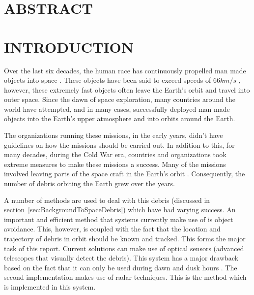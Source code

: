 \documentclass[11pt]{witseiepaper}
\begin{document}
\section*{ABSTRACT}


\clearpage


\clearpage

\tableofcontents

\listoffigures

\listoftables

\onecolumn
\clearpage
{}


\section{INTRODUCTION} \label{sec:INTRODUCTION}

Over the last six decades, the human race has continuously propelled man made objects into space \cite{sputnik}. These objects have been said to exceed speeds of $66 km/s$ \cite{fastestObject}, however, these extremely fast objects often leave the Earth's orbit and travel into outer space. Since the dawn of space exploration, many countries around the world have attempted, and in many cases, successfully deployed man made objects into the Earth's upper atmosphere and into orbits around the Earth.

The organizations running these missions, in the early years, didn't have guidelines on how the missions should be carried out. In addition to this, for many decades, during the Cold War era, countries and organizations took extreme measures to make these missions a success. Many of the missions involved leaving parts of the space craft in the Earth's orbit \cite{spaceDebrisGuide}. Consequently, the number of debris orbiting the Earth grew over the years.

A number of methods are used to deal with this debris (discussed in section~\ref{sec:BackgroundToSpaceDebris}) which have had varying success.
An important and efficient method that systems currently make use of is object avoidance. This, however, is coupled with the fact that the location and trajectory of debris in orbit should be known and tracked. This forms the major task of this report.
Current solutions can make use of optical sensors (advanced telescopes that visually detect the debris). This system has a major drawback based on the fact that it can only be used during dawn and dusk hours \cite{OrbitalDebrisTechnicalAssessment,telescope,ZenithRanging}.
The second implementation makes use of radar techniques. This is the method which is implemented in this system.
\end{document}
